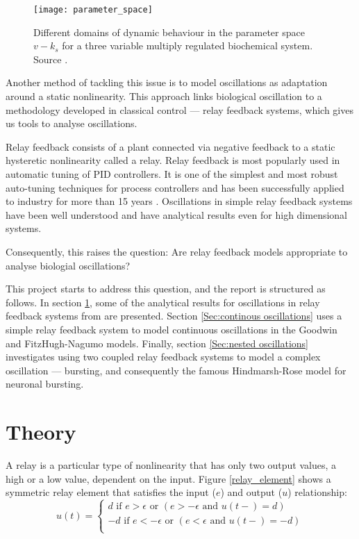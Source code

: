 \documentclass[a4paper, 12pt]{article}
\begin{document}
\begin{figure}[h!]
\texttt{[image: parameter\_space]}
\caption{Different domains of dynamic behaviour in the parameter space $v-k_s$ for a three variable multiply regulated biochemical system. Source \cite{goldbeter2}.}
\label{parameter_search}
\end{figure}

Another method of tackling this issue is to model oscillations as adaptation around a static nonlinearity. This approach links biological oscillation to a methodology developed in classical control --- relay feedback systems, which gives us tools to analyse oscillations.

Relay feedback consists of a plant connected via negative feedback to a static hysteretic nonlinearity called a relay. Relay feedback is most popularly used in automatic tuning of PID controllers. It is one of the simplest and most robust auto-tuning techniques for process controllers and has been successfully applied to industry for more than 15 years \cite{hang}. Oscillations in simple relay feedback systems have been well understood and have analytical results even for high dimensional systems. 

Consequently, this raises the question: Are relay feedback models appropriate to analyse biologial oscillations? 
 
This project starts to address this question, and the report is structured as follows. In section \ref{Sec:theory}, some of the analytical results for oscillations in relay feedback systems from \cite{astrom1995} are presented. Section \ref{Sec:continous oscillations} uses a simple relay feedback system to model continuous oscillations in the Goodwin and FitzHugh-Nagumo models. Finally, section \ref{Sec:nested oscillations} investigates using two coupled relay feedback systems to model a complex oscillation --- bursting, and consequently the famous Hindmarsh-Rose model for neuronal bursting.   

\section{Theory}\label{Sec:theory}
A relay is a particular type of nonlinearity that has only two output values, a high or a low value, dependent on the input. Figure \ref{relay_element} shows a symmetric relay element that satisfies the input ($e$) and output ($u$) relationship:
\begin{equation}
	u(t)=\begin{cases}
	               d \text{ if } e > \epsilon \text{ or } (e >-\epsilon \text{ and } u(t-) = d)\\
	                -d \text{ if } e < -\epsilon \text{ or } (e < \epsilon \text{ and } u(t-) = -d)\\
	              
	            \end{cases}
	            \label{eq:symmetric_relay_equation}
\end{equation}
\end{document}
